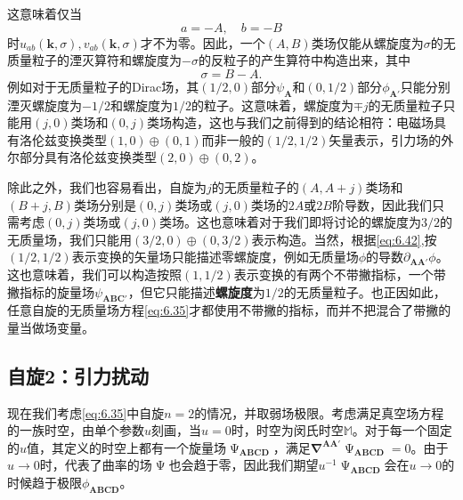这意味着仅当
\begin{equation*}
	a=-A,\quad b=-B
\end{equation*}
时$u_{ab}(\boldsymbol{k} ,\sigma ) ,v_{ab}(\boldsymbol{k} ,\sigma )$才不为零。因此，一个$( A,B)$类场仅能从螺旋度为$\sigma $的无质量粒子的湮灭算符和螺旋度为$-\sigma $的反粒子的产生算符中构造出来，其中
\begin{equation}
	\sigma =B-A.
	\label{eq:6.42}
\end{equation}
例如对于无质量粒子的Dirac场，其$( 1/2,0)$部分$\psi _{\boldsymbol{A}}$和$( 0,1/2)$部分$\phi _{\boldsymbol{A} '}$只能分别湮灭螺旋度为$-1/2$和螺旋度为$1/2$的粒子。这意味着，螺旋度为$\mp j$的无质量粒子只能用$( j,0)$类场和$( 0,j)$类场构造，这也与我们之前得到的结论相符：电磁场具有洛伦兹变换类型$( 1,0) \oplus ( 0,1)$而非一般的$( 1/2,1/2)$矢量表示，引力场的外尔部分具有洛伦兹变换类型$( 2,0) \oplus ( 0,2)$。



除此之外，我们也容易看出，自旋为$j$的无质量粒子的$( A,A+j)$类场和$( B+j,B)$类场分别是$( 0,j)$类场或$( j,0)$类场的$2A$或$2B$阶导数，因此我们只需考虑$( 0,j)$类场或$( j,0)$类场。这也意味着对于我们即将讨论的螺旋度为$3/2$的无质量场，我们只能用$( 3/2,0) \oplus ( 0,3/2)$表示构造。当然，根据\ref{eq:6.42},按$( 1/2,1/2)$表示变换的矢量场只能描述零螺旋度，例如无质量场$\phi $的导数$\partial _{\boldsymbol{AA} '} \phi $。这也意味着，我们可以构造按照$( 1,1/2)$表示变换的有两个不带撇指标，一个带撇指标的旋量场$\psi _{\boldsymbol{ABC} '}$，但它只能描述\textbf{螺旋度}为$1/2$的无质量粒子。也正因如此，任意自旋的无质量场方程\ref{eq:6.35}才都使用不带撇的指标，而并不把混合了带撇的量当做场变量。


\subsection{自旋2：引力扰动}

现在我们考虑\ref{eq:6.35}中自旋$n=2$的情况，并取弱场极限。考虑满足真空场方程的一族时空，由单个参数$u$刻画，当$u=0$时，时空为闵氏时空$\mathbb{M}$。对于每一个固定的$u$值，其定义的时空上都有一个旋量场$\upPsi _{\boldsymbol{ABCD}}$，满足$\mathbf{\nabla }^{\boldsymbol{AA} '} \upPsi _{\boldsymbol{ABCD}} =0$。由于$u\rightarrow 0$时，代表了曲率的场$\upPsi $也会趋于零，因此我们期望$u^{-1} \upPsi _{\boldsymbol{ABCD}}$会在$u\rightarrow 0$的时候趋于极限$\phi _{\boldsymbol{ABCD}}$。



